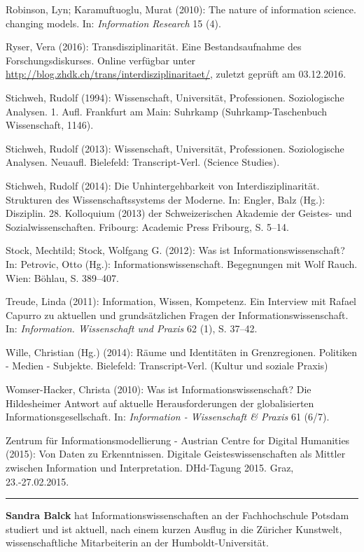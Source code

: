 \documentclass[a4paper,
fontsize=11pt,
oneside,
numbers=noperiodatend,
parskip=half-,
bibliography=totoc,
final
]{scrartcl}
\begin{document}
Robinson, Lyn; Karamuftuoglu, Murat (2010): The nature of information
science. changing models. In: \emph{Information Research} 15 (4).

Ryser, Vera (2016): Transdisziplinarität. Eine Bestandsaufnahme des
Forschungsdiskurses. Online verfügbar unter
\url{http://blog.zhdk.ch/trans/interdisziplinaritaet/}, zuletzt geprüft
am 03.12.2016.

Stichweh, Rudolf (1994): Wissenschaft, Universität, Professionen.
Soziologische Analysen. 1. Aufl. Frankfurt am Main: Suhrkamp
(Suhrkamp-Taschenbuch Wissenschaft, 1146).

Stichweh, Rudolf (2013): Wissenschaft, Universität, Professionen.
Soziologische Analysen. Neuaufl. Bielefeld: Transcript-Verl. (Science
Studies).

Stichweh, Rudolf (2014): Die Unhintergehbarkeit von
Interdisziplinarität. Strukturen des Wissenschaftssystems der Moderne.
In: Engler, Balz (Hg.): Disziplin. 28. Kolloquium (2013) der
Schweizerischen Akademie der Geistes- und Sozialwissenschaften.
Fribourg: Academic Press Fribourg, S. 5--14.

Stock, Mechtild; Stock, Wolfgang G. (2012): Was ist
Informationswissenschaft? In: Petrovic, Otto (Hg.):
Informationswissenschaft. Begegnungen mit Wolf Rauch. Wien: Böhlau, S.
389--407.

Treude, Linda (2011): Information, Wissen, Kompetenz. Ein Interview mit
Rafael Capurro zu aktuellen und grundsätzlichen Fragen der
Informationswissenschaft. In: \emph{Information. Wissenschaft und
Praxis} 62 (1), S. 37--42.

Wille, Christian (Hg.) (2014): Räume und Identitäten in Grenzregionen.
Politiken - Medien - Subjekte. Bielefeld: Transcript-Verl. (Kultur und
soziale Praxis)

Womser-Hacker, Christa (2010): Was ist Informationswissenschaft? Die
Hildesheimer Antwort auf aktuelle Herausforderungen der globalisierten
Informationsgesellschaft. In: \emph{Information - Wissenschaft \&
Praxis} 61 (6/7).

Zentrum für Informationsmodellierung - Austrian Centre for Digital
Humanities (2015): Von Daten zu Erkenntnissen. Digitale
Geisteswissenschaften als Mittler zwischen Information und
Interpretation. DHd-Tagung 2015. Graz, 23.-27.02.2015.

\begin{center}\rule{0.5\linewidth}{\linethickness}\end{center}

\textbf{Sandra Balck} hat Informationswissenschaften an der
Fachhochschule Potsdam studiert und ist aktuell, nach einem kurzen
Ausflug in die Züricher Kunstwelt, wissenschaftliche Mitarbeiterin an
der Humboldt-Universität.
\end{document}
